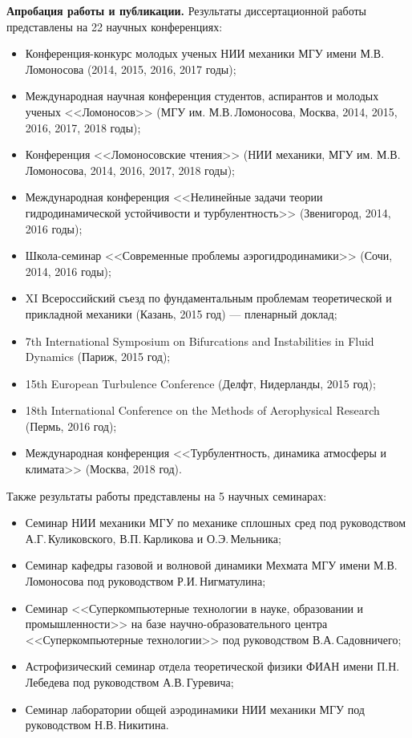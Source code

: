 {\bf Апробация работы и публикации.} 
Результаты диссертационной работы представлены на 22 научных конференциях: 
\begin{itemize}
\item Конференция-конкурс молодых ученых НИИ механики МГУ имени М.В. Ломоносова (2014, 2015, 2016, 2017 годы); 
\item Международная научная конференция студентов, аспирантов и молодых ученых <<Ломоносов>> (МГУ им. М.В.\,Ломоносова, Москва, 2014, 2015, 2016, 2017, 2018 годы); 
\item Конференция <<Ломоносовские чтения>> (НИИ механики, МГУ им. М.В. Ломоносова, 2014, 2016, 2017, 2018 годы); 
\item Международная конференция <<Нелинейные задачи теории гидродинамической устойчивости и турбулентность>> (Звенигород, 2014, 2016 годы); 
\item Школа-семинар <<Современные проблемы аэрогидродинамики>> (Сочи, 2014, 2016 годы);  
\item XI Всероссийский съезд по фундаментальным проблемам теоретической и прикладной механики (Казань, 2015 год) --- пленарный доклад;
\item 7th International Symposium on Bifurcations and Instabilities in Fluid Dynamics (Париж, 2015 год);
\item 15th European Turbulence Conference (Делфт, Нидерланды, 2015 год); 
\item 18th International Conference on the Methods of Aerophysical Research (Пермь, 2016 год);
\item Международная конференция <<Турбулентность, динамика атмосферы и климата>> (Москва, 2018 год).
\end{itemize}
Также результаты работы представлены на 5 научных семинарах:
\begin{itemize}
\item Семинар НИИ механики МГУ по механике сплошных сред под руководством А.Г.\,Куликовского, В.П.\,Карликова и О.Э.\,Мельника;
\item Семинар кафедры газовой и волновой динамики Мехмата МГУ имени М.В. Ломоносова под руководством Р.И.\,Нигматулина;
\item Семинар <<Суперкомпьютерные технологии в науке, образовании и промышленности>> на базе научно-образовательного центра <<Суперкомпьютерные технологии>> под руководством В.А.\,Садовничего;
\item Астрофизический семинар отдела теоретической физики ФИАН имени П.Н.\,Лебедева под руководством А.В.\,Гуревича;
\item Семинар лаборатории общей аэродинамики НИИ механики МГУ под руководством Н.В.\,Никитина.
\end{itemize}
